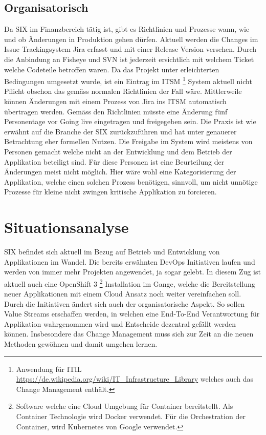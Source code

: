 \subsection{Organisatorisch}

Da SIX im Finanzbereich tätig ist, gibt es Richtlinien und Prozesse wann, wie und ob Änderungen in Produktion gehen dürfen. Aktuell werden die Changes im Issue Trackingsystem Jira erfasst und mit einer Release Version versehen. Durch die Anbindung an Fisheye und SVN ist jederzeit ersichtlich mit welchem Ticket welche Codeteile betroffen waren. Da das Projekt unter erleichterten Bedingungen umgesetzt wurde, ist ein Eintrag im ITSM \footnote{Anwendung für ITIL \url{https://de.wikipedia.org/wiki/IT_Infrastructure_Library} welches auch das Change Management enthält.} System aktuell nicht Pflicht obschon das gemäss normalen Richtlinien der Fall wäre. Mittlerweile können Änderungen mit einem Prozess von Jira ins ITSM automatisch übertragen werden.
Gemäss den Richtlinien müsste eine Änderung fünf Personentage vor Going live eingetragen und freigegeben sein. Die Praxis ist wie erwähnt auf die Branche der SIX zurückzuführen und hat unter genauerer Betrachtung eher formellen Nutzen. Die Freigabe im System wird meistens von Personen gemacht welche nicht an der Entwicklung und dem Betrieb der Applikation beteiligt sind. Für diese Personen ist eine Beurteilung der Änderungen meist nicht möglich. Hier wäre wohl eine Kategorisierung der Applikation, welche einen solchen Prozess benötigen, sinnvoll, um nicht unnötige Prozesse für kleine nicht zwingen kritische Applikation zu forcieren.

\section{Situationsanalyse}

SIX befindet sich aktuell im Bezug auf Betrieb und Entwicklung von Applikationen im Wandel. Die bereits erwähnten DevOps Initiativen laufen und werden von immer mehr Projekten angewendet, ja sogar gelebt. In diesem Zug ist aktuell auch eine OpenShift 3 \footnote{Software welche eine Cloud Umgebung für Container bereitstellt. Als Container Technologie wird Docker verwendet. Für die Orchestration der Container, wird Kubernetes von Google verwendet.} Installation im Gange, welche die Bereitstellung neuer Applikationen mit einem Cloud Ansatz noch weiter vereinfachen soll.
Durch die Initiativen ändert sich auch der organisatorische Aspekt. So sollen Value Streams erschaffen werden, in welchen eine End-To-End Verantwortung für Applikation wahrgenommen wird und Entscheide dezentral gefällt werden können. Insbesondere das Change Management muss sich zur Zeit an die neuen Methoden gewöhnen und damit umgehen lernen.

